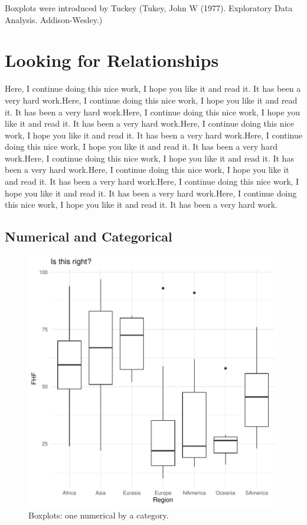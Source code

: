 \documentclass[11pt]{article}
\begin{document}
Boxplots were introduced by Tuckey (Tukey, John W (1977). Exploratory Data Analysis. Addison-Wesley.)

\section{Looking for Relationships}\label{bivar}


Here, I continue doing this nice work, I hope you like it and read it. It has been a very hard work.Here, I continue doing this nice work, I hope you like it and read it. It has been a very hard work.Here, I continue doing this nice work, I hope you like it and read it. It has been a very hard work.Here, I continue doing this nice work, I hope you like it and read it. It has been a very hard work.Here, I continue doing this nice work, I hope you like it and read it. It has been a very hard work.Here, I continue doing this nice work, I hope you like it and read it. It has been a very hard work.Here, I continue doing this nice work, I hope you like it and read it. It has been a very hard work.Here, I continue doing this nice work, I hope you like it and read it. It has been a very hard work.Here, I continue doing this nice work, I hope you like it and read it. It has been a very hard work.

\subsection{Numerical and  Categorical}\label{binumcat}



\begin{figure}[h]
\centering
\begin{adjustbox}{width=7cm,height=7cm} 
\includegraphics{PaperInR_5-numcat_plot}
\end{adjustbox}
\caption{Boxplots: one numerical by a category.}  
\label{numcat_plot} 
\end{figure}
\end{document}
